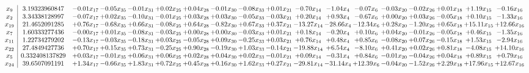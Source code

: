 \documentclass[9pt]{article}
\begin{document}
 \[\begin{array}{c| c c@{\hskip 2pt} c@{\hskip 2pt} c@{\hskip 2pt} c@{\hskip 2pt} c@{\hskip 2pt} c@{\hskip 2pt} c@{\hskip 2pt} c@{\hskip 2pt} c@{\hskip 2pt} c@{\hskip 2pt} c@{\hskip 2pt} c@{\hskip 2pt} c@{\hskip 2pt} c@{\hskip 2pt} c@{\hskip 2pt} c@{\hskip 2pt} }
 x_{9}   &  3.19323960847 & -0.01 x_{17} & -0.05 x_{35} & -0.01 x_{31} & +  0.02 x_{25} & +  0.04 x_{28} & -0.01 x_{30} & -0.08 x_{33} & +  0.01 x_{21} & -0.70 x_{14} & -1.04 x_{4} & -0.07 x_{6} & -0.03 x_{20} & -0.02 x_{26} & +  0.01 x_{18} & +  1.19 x_{15} & -0.16 x_{16}\\
 x_{2}   &  3.34338128997 & -0.07 x_{17} & +  0.02 x_{35} & -0.10 x_{31} & -0.01 x_{25} & +  0.03 x_{28} & +  0.03 x_{30} & -0.05 x_{33} & -0.03 x_{21} & +  0.20 x_{14} & +  0.93 x_{4} & -0.67 x_{6} & +  0.00 x_{20} & +  0.03 x_{26} & -0.05 x_{18} & +  0.10 x_{15} & -1.33 x_{16}\\
 x_{19}   &  21.4652091285 & +  0.76 x_{17} & -0.68 x_{35} & +  0.66 x_{31} & -0.08 x_{25} & +  0.64 x_{28} & -0.82 x_{30} & +  0.67 x_{33} & +  0.37 x_{21} & -13.27 x_{14} & -28.66 x_{4} & -12.34 x_{6} & +  0.28 x_{20} & -1.20 x_{26} & +  0.65 x_{18} & + 15.11 x_{15} & + 12.66 x_{16}\\
 x_{7}   &  1.60333277436 & -0.00 x_{17} & +  0.01 x_{35} & -0.08 x_{31} & -0.03 x_{25} & +  0.00 x_{28} & +  0.00 x_{30} & -0.03 x_{33} & +  0.01 x_{21} & +  0.18 x_{14} & -0.20 x_{4} & +  0.10 x_{6} & +  0.04 x_{20} & -0.01 x_{26} & -0.05 x_{18} & +  0.46 x_{15} & -1.35 x_{16}\\
 x_{11}   &  1.22734279202 & -0.13 x_{17} & -0.03 x_{35} & -0.18 x_{31} & +  0.03 x_{25} & -0.05 x_{28} & +  0.09 x_{30} & -0.25 x_{33} & +  0.03 x_{21} & +  0.76 x_{14} & +  0.48 x_{4} & +  0.85 x_{6} & -0.08 x_{20} & +  0.07 x_{26} & -0.15 x_{18} & +  1.53 x_{15} & -2.94 x_{16}\\
 x_{22}   &  27.4849427736 & +  0.70 x_{17} & +  0.15 x_{35} & +  0.73 x_{31} & -0.25 x_{25} & +  0.90 x_{28} & -0.19 x_{30} & +  1.03 x_{33} & -0.14 x_{21} & -19.88 x_{14} & +  6.54 x_{4} & -8.10 x_{6} & +  0.41 x_{20} & +  0.02 x_{26} & +  0.81 x_{18} & -4.08 x_{15} & + 14.10 x_{16}\\
 x_{5}   &  0.332408137829 & +  0.03 x_{17} & -0.01 x_{35} & +  0.06 x_{31} & +  0.06 x_{25} & +  0.02 x_{28} & +  0.04 x_{30} & +  0.02 x_{33} & -0.01 x_{21} & +  0.09 x_{14} & -0.31 x_{4} & +  0.84 x_{6} & -0.01 x_{20} & -0.04 x_{26} & +  0.04 x_{18} & +  0.89 x_{15} & +  0.79 x_{16}\\
 x_{24}   &  39.6507091191 & +  1.34 x_{17} & -0.66 x_{35} & +  1.83 x_{31} & +  0.72 x_{25} & +  0.45 x_{28} & +  0.16 x_{30} & +  1.62 x_{33} & +  0.27 x_{21} & -29.81 x_{14} & -31.14 x_{4} & + 12.39 x_{6} & -0.04 x_{20} & -1.52 x_{26} & +  2.29 x_{18} & + 17.96 x_{15} & + 12.67 x_{16}\\

\end{array}\]
\end{document}
